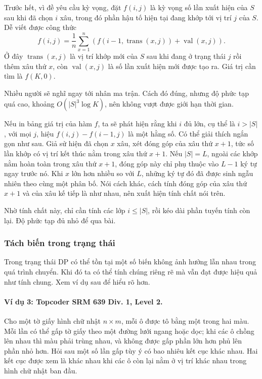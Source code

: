 \documentclass[11pt]{article}
\begin{document}
Trước hết, vì đề yêu cầu kỳ vọng, đặt \(f(i,j)\) là kỳ vọng số lần xuất hiện của
\(S\) sau khi đã chọn \(i\) xâu, trong đó phần hậu tố hiện tại đang khớp tới vị
trí \(j\) của \(S\). Dễ viết được công thức
\[
  f(i,j)=\frac{1}{n}\sum_{x=1}^{n}
  \left(f(i-1,\operatorname{trans}(x,j))+\operatorname{val}(x,j)\right).
\]
Ở đây \(\operatorname{trans}(x,j)\) là vị trí khớp mới của \(S\) sau khi đang ở
trạng thái \(j\) rồi thêm xâu thứ \(x\), còn \(\operatorname{val}(x,j)\) là số
lần xuất hiện mới được tạo ra. Giá trị cần tìm là \(f(K,0)\).

Nhiều người sẽ nghĩ ngay tới nhân ma trận. Cách đó đúng, nhưng độ phức tạp quá
cao, khoảng \(O(|S|^3\log K)\), nên không vượt được giới hạn thời gian.

Nếu in bảng giá trị của hàm \(f\), ta sẽ phát hiện rằng khi \(i\) đủ lớn, cụ thể
là \(i>|S|\), với mọi \(j\), hiệu \(f(i,j)-f(i-1,j)\) là một hằng số. Có thể
giải thích ngắn gọn như sau. Giả sử hiện đã chọn \(x\) xâu, xét đóng góp của xâu
thứ \(x+1\), tức số lần khớp có vị trí kết thúc nằm trong xâu thứ \(x+1\). Nếu
\(|S|=L\), ngoài các khớp nằm hoàn toàn trong xâu thứ \(x+1\), đóng góp này chỉ
phụ thuộc vào \(L-1\) ký tự ngay trước nó. Khi \(x\) lớn hơn nhiều so với \(L\),
những ký tự đó đã được sinh ngẫu nhiên theo cùng một phân bố. Nói cách khác,
cách tính đóng góp của xâu thứ \(x+1\) và của xâu kế tiếp là như nhau, nên xuất
hiện tính chất nói trên.

Nhờ tính chất này, chỉ cần tính các lớp \(i\le |S|\), rồi kéo dài phần tuyến
tính còn lại. Độ phức tạp đủ nhỏ để qua bài.

\subsubsection{Tách biến trong trạng thái}

Trong trạng thái DP có thể tồn tại một số biến không ảnh hưởng lẫn nhau trong
quá trình chuyển. Khi đó ta có thể tính chúng riêng rẽ mà vẫn đạt được hiệu quả
như tính chung. Xem ví dụ sau để hiểu rõ hơn.

\paragraph{Ví dụ 3: Topcoder SRM 639 Div. 1, Level 2.}
Cho một tờ giấy hình chữ nhật \(n\times m\), mỗi ô được tô bằng một trong hai
màu. Mỗi lần có thể gấp tờ giấy theo một đường lưới ngang hoặc dọc; khi các ô
chồng lên nhau thì màu phải trùng nhau, và không được gấp phần lớn hơn phủ lên
phần nhỏ hơn. Hỏi sau một số lần gấp tùy ý có bao nhiêu kết cục khác nhau. Hai
kết cục được xem là khác nhau khi các ô còn lại nằm ở vị trí khác nhau trong
hình chữ nhật ban đầu.
\end{document}
